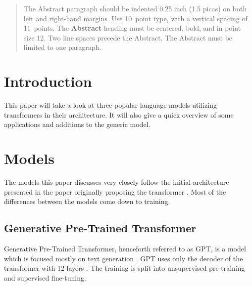\documentclass[twoside]{article}
\begin{document}
%

%


\begin{abstract}
  The Abstract paragraph should be indented 0.25 inch (1.5 picas) on
  both left and right-hand margins. Use 10~point type, with a vertical
  spacing of 11~points.  The {\bf Abstract} heading must be centered,
  bold, and in point size 12. Two line spaces precede the
  Abstract. The Abstract must be limited to one paragraph.
\end{abstract}

\section{Introduction}
This paper will take a look at three popular language models utilizing
transformers in their architecture. It will also give a quick overview
of some applications and additions to the generic model.

\section{Models}

The models this paper discusses very closely follow the initial architecture
presented in the paper originally proposing the transformer 
\cite{vaswani_attention_2017}. Most of the differences between 
the models come down to training.

\subsection{Generative Pre-Trained Transformer}
Generative Pre-Trained Transformer, henceforth referred to as GPT, is a model
which is focused mostly on text generation \cite{brown_language_2020}. 
GPT uses only the decoder of the transformer with 12 layers 
\cite{radford_improving_nodate}. The training is split into unsupervised
pre-training and supervised fine-tuning. 
\end{document}
